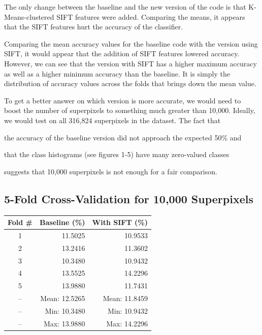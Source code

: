 \documentclass[10pt,twocolumn,letterpaper]{article}
\begin{document}
The only change between the baseline and the new version of the code is that K-Means-clustered SIFT features were added.  Comparing the means, it appears that the SIFT features hurt the accuracy of the classifier.

Comparing the mean accuracy values for the baseline code with the version using SIFT, it would appear that the addition of SIFT features lowered accuracy.  However, we can see that the version with SIFT has a higher maximum accuracy as well as a higher minimum accuracy than the baseline.  It is simply the distribution of accuracy values across the folds that brings down the mean value.

To get a better answer on which version is more accurate, we would need to boost the number of superpixels to something much greater than 10,000. Ideally, we would test on all 316,824 superpixels in the dataset.  The fact that \begin{inparaenum} \item the accuracy of the baseline version did not approach the expected 50\% and \item that the class histograms (see figures 1-5) have many zero-valued classes \end{inparaenum} suggests that 10,000 superpixels is not enough for a fair comparison.

\subsection{5-Fold Cross-Validation for 10,000 Superpixels}
\label{sec:crossVal}

\begin{center}
  \begin{tabular}{ c | r | r }
  	\textbf{Fold \#} & \textbf{Baseline (\%)} & \textbf{With SIFT (\%)} \\
    \hline
    1 & 11.5025 & 10.9533\\ \hline
    2 & 13.2416 & 11.3602\\ \hline
    3 & 10.3480 & 10.9432\\ \hline
    4 & 13.5525 & 14.2296\\ \hline
    5 & 13.9880 & 11.7431\\ \hline
    -- & Mean: \hfill 12.5265 & Mean: \hfill 11.8459\\ \hline
    -- & Min: \hfill 10.3480 & Min: \hfill 10.9432\\ \hline
    -- & Max: \hfill 13.9880 & Max: \hfill 14.2296\\
    \hline
  \end{tabular}
\end{center}
\end{document}
